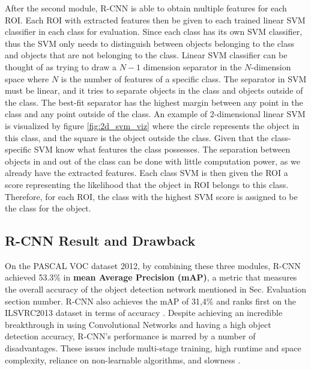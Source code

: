 After the second module, R-CNN is able to obtain multiple features for each ROI. Each ROI with extracted features then be given to each trained linear SVM classifier in each class for evaluation. Since each class has its own SVM classifier, thus the SVM only needs to distinguish between objects belonging to the class and objects that are not belonging to the class. Linear SVM classifier can be thought of as trying to draw a $N-1$ dimension separator in the $N$-dimension space where $N$ is the number of features of a specific class. The separator in SVM must be linear, and it tries to separate objects in the class and objects outside of the class. The best-fit separator has the highest margin between any point in the class and any point outside of the class. An example of 2-dimensional linear SVM is visualized by figure \ref{fig:2d_svm_viz} where the circle represents the object in this class, and the square is the object outside the class. Given that the class-specific SVM know what features the class possesses. The separation between objects in and out of the class can be done with little computation power, as we already have the extracted features. Each class SVM is then given the ROI a score representing the likelihood that the object in ROI belongs to this class. Therefore, for each ROI, the class with the highest SVM score is assigned to be the class for the object.

\subsection{R-CNN Result and Drawback}
On the PASCAL VOC dataset 2012, by combining these three modules, R-CNN achieved 53.3\% in \textbf{mean Average Precision (mAP)}, a metric that measures the overall accuracy of the object detection network mentioned in Sec. {\color{red} Evaluation section number}. R-CNN also achieves the mAP of 31,4\% and ranks first on the ILSVRC2013 dataset in terms of accuracy \cite{Girshick_R_CNN_2013}. Despite achieving an incredible breakthrough in using Convolutional Networks and having a high object detection accuracy, R-CNN's performance is marred by a number of disadvantages. These issues include multi-stage training, high runtime and space complexity, reliance on non-learnable algorithms, and slowness \cite{fast_rcnn_og}. 

